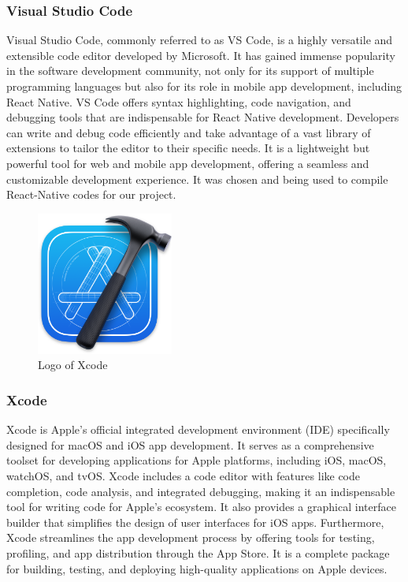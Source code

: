\documentclass[conference]{IEEEtran}
\begin{document}
        \subsubsection{Visual Studio Code}
        Visual Studio Code, commonly referred to as VS Code, is a highly versatile and extensible code editor developed by Microsoft. It has gained immense popularity in the software development community, not only for its support of multiple programming languages but also for its role in mobile app development, including React Native. VS Code offers syntax highlighting, code navigation, and debugging tools that are indispensable for React Native development. Developers can write and debug code efficiently and take advantage of a vast library of extensions to tailor the editor to their specific needs. It is a lightweight but powerful tool for web and mobile app development, offering a seamless and customizable development experience. It was chosen and being used to compile React-Native codes for our project.\\
    
    
        \begin{figure}[htbp]
        \centerline{\includegraphics[width=4.5cm]{Images/logo/xcode.png}}
        \label{fig}
        \caption{Logo of Xcode}
        \end{figure}
        \subsubsection{Xcode}
         Xcode is Apple's official integrated development environment (IDE) specifically designed for macOS and iOS app development. It serves as a comprehensive toolset for developing applications for Apple platforms, including iOS, macOS, watchOS, and tvOS. Xcode includes a code editor with features like code completion, code analysis, and integrated debugging, making it an indispensable tool for writing code for Apple's ecosystem. It also provides a graphical interface builder that simplifies the design of user interfaces for iOS apps. Furthermore, Xcode streamlines the app development process by offering tools for testing, profiling, and app distribution through the App Store. It is a complete package for building, testing, and deploying high-quality applications on Apple devices.\\
    
\end{document}
